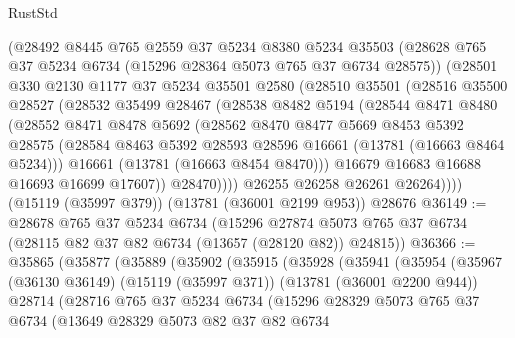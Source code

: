 \begin{lexlean}{RustStd}
\begin{coremodule}
        (@28492
          @8445
          @765
          @2559
          @37
          @5234
          @8380
          @5234
          @35503
          (@28628 @765 @37 @5234 @6734 (@15296 @28364 @5073 @765 @37 @6734 @28575))
          (@28501
            @330
            @2130
            @1177
            @37
            @5234
            @35501
            @2580
            (@28510
              @35501
              (@28516
                @35500
                @28527
                (@28532
                  @35499
                  @28467
                  (@28538
                    @8482
                    @5194
                    (@28544
                      @8471
                      @8480
                      (@28552
                        @8471
                        @8478
                        @5692
                        (@28562
                          @8470
                          @8477
                          @5669
                          @8453
                          @5392
                          @28575
                          (@28584 @8463 @5392 @28593 @28596 @16661 (@13781 (@16663 @8464 @5234)))
                          @16661
                          (@13781 (@16663 @8454 @8470)))
                        @16679
                        @16683
                        @16688
                        @16693
                        @16699
                        @17607))
                    @28470))))
            @26255
            @26258
            @26261
            @26264))))
    (@15119 (@35997 @379))
    (@13781 (@36001 @2199 @953))
    @28676
@36149 := @28678
    @765
    @37
    @5234
    @6734
    (@15296 @27874 @5073 @765 @37 @6734 (@28115 @82 @37 @82 @6734 (@13657 (@28120 @82)) @24815))
@36366 := @35865
    (@35877
      (@35889
        (@35902
          (@35915
            (@35928
              (@35941
                (@35954
                  (@35967
                    (@36130 @36149)
                    (@15119 (@35997 @371))
                    (@13781 (@36001 @2200 @944))
                    @28714
                    (@28716
                      @765
                      @37
                      @5234
                      @6734
                      (@15296
                        @28329
                        @5073
                        @765
                        @37
                        @6734
                        (@13649
                          @28329
                          @5073
                          @82
                          @37
                          @82
                          @6734

\end{coremodule}
\end{lexlean}
